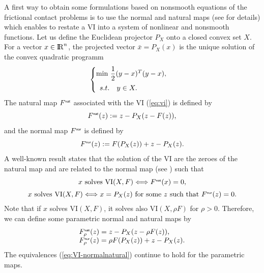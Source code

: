 A first way to obtain some formulations based on nonsmooth equations of the frictional contact problems is to use the normal and natural maps (see \cite{Facchinei.Pang2003} for details) which enables to restate a VI into a system of nonlinear and  nonsmooth functions.  Let us define the Euclidean projector $P_X$ onto a closed convex set  $X$. For a vector $x\in \mathrm{I\!R}^n$, the projected vector $\bar x  = P_X(x)$ is the unique solution of the convex quadratic programm
\begin{equation}
  \label{eq:opt-proj}
  \begin{cases}
    \min\, \Frac 1 2 (y-x)^T(y-x), \\[2mm]
    \begin{array}{ll}
    s.t. & y \in X .
  \end{array}
  \end{cases}
\end{equation}
 The natural map $F^{\hbox{\sf \tiny{nat}}}$ associated with the VI (\ref{eq:vi}) is defined by
\begin{equation}
  \label{eq:naturalmap}
  F^\nat(z) := z - P_{X}(z-F(z)),
\end{equation}
and  the normal map $F^{\hbox{\sf \tiny{nor}}}$ is defined by
\begin{equation}
  \label{eq:normalmap}
  F^\nor(z) := F(P_X(z)) + z - P_{X}(z).
\end{equation}
A well-known result states that the solution of the VI are  the zeroes of the natural map and are related to the normal map (see \cite{Facchinei.Pang2003}) such that
\begin{equation}
  \label{eq:VI-normalnatural}
  \begin{array}{c}
  x \text{ solves } \mathrm{VI}(X,F) \Longleftrightarrow  F^\nat(x)=0, \\[2mm]
  x \text{ solves } \mathrm{VI}(X,F) \Longleftrightarrow x= P_X(z) \text{ for some } z \text{ such that } F^\nor(z)=0.
\end{array}
\end{equation}
Note that if $x$ solves  $\mathrm{VI}(X,F)$, it solves also  $\mathrm{VI}(X,\rho F)$ for $\rho > 0$. Therefore, we can define some parametric normal and natural maps by
\begin{equation}
  \label{eq:parametrized-naturalnormalmap}
  \begin{array}{l}
    F_\rho^\nat(z) = z - P_{X}(z-\rho F(z)), \\
    F_\rho^\nor(z) = \rho F(P_X(z)) + z - P_{X}(z).
  \end{array}
\end{equation}
The equivalences (\ref{eq:VI-normalnatural}) continue to hold for the parametric maps. 
 

